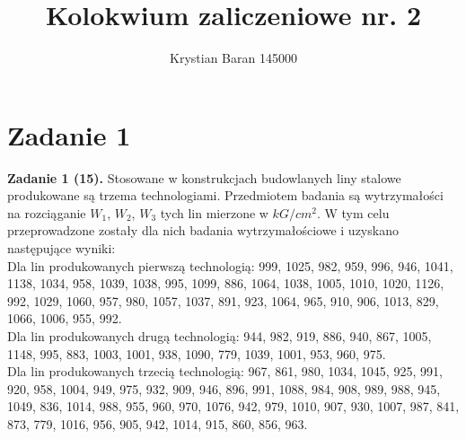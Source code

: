 \documentclass{article}
\author{Krystian Baran 145000}
\title{Kolokwium zaliczeniowe nr. 2}
\begin{document}
\maketitle
\newpage

\tableofcontents
\newpage

\section{Zadanie 1}
\textbf{Zadanie 1 (15).} Stosowane w konstrukcjach budowlanych liny stalowe produkowane są trzema
technologiami. Przedmiotem badania są wytrzymałości na rozciąganie $W_1$, $W_2$, $W_3$ tych lin
mierzone w $kG/cm^2$. W tym celu przeprowadzone zostały dla nich badania wytrzymałościowe
i uzyskano następujące wyniki: \\

Dla lin produkowanych pierwszą technologią: 999, 1025, 982, 959, 996, 946, 1041, 1138, 1034,
958, 1039, 1038, 995, 1099, 886, 1064, 1038, 1005, 1010, 1020, 1126, 992, 1029, 1060, 957,
980, 1057, 1037, 891, 923, 1064, 965, 910, 906, 1013, 829, 1066, 1006, 955, 992. \\

Dla lin produkowanych drugą technologią: 944, 982, 919, 886, 940, 867, 1005, 1148, 995, 883,
1003, 1001, 938, 1090, 779, 1039, 1001, 953, 960, 975. \\

Dla lin produkowanych trzecią technologią: 967, 861, 980, 1034, 1045, 925, 991, 920, 958,
1004, 949, 975, 932, 909, 946, 896, 991, 1088, 984, 908, 989, 988, 945, 1049, 836, 1014, 988,
955, 960, 970, 1076, 942, 979, 1010, 907, 930, 1007, 987, 841, 873, 779, 1016, 956, 905, 942,
1014, 915, 860, 856, 963. \\
\end{document}
